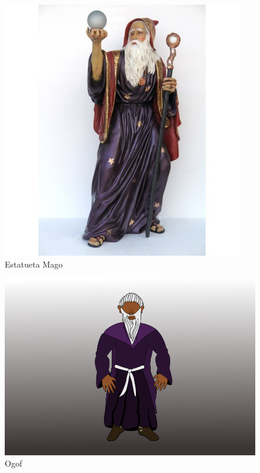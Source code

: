 \begin{figure}[htb]
	\caption{\label{mago}Estatueta Mago}
	\begin{center}
	    \includegraphics[width=\textwidth/2]{imagens/mago.jpg}
	\end{center}
\end{figure}

\begin{figure}[htb]
	\caption{\label{Ogof}Ogof}
	\begin{center}
	    \includegraphics[width=\textwidth/2]{imagens/Ogof.jpg}
	\end{center}
\end{figure}

